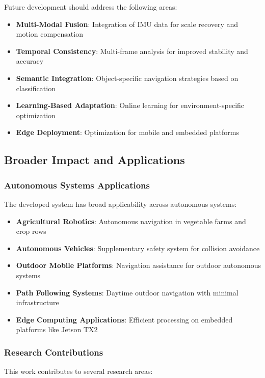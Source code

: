 \documentclass[10pt]{article}
\begin{document}
Future development should address the following areas:

\begin{itemize}
\item \textbf{Multi-Modal Fusion}: Integration of IMU data for scale recovery and motion compensation
\item \textbf{Temporal Consistency}: Multi-frame analysis for improved stability and accuracy
\item \textbf{Semantic Integration}: Object-specific navigation strategies based on classification
\item \textbf{Learning-Based Adaptation}: Online learning for environment-specific optimization
\item \textbf{Edge Deployment}: Optimization for mobile and embedded platforms
\end{itemize}

\subsection{Broader Impact and Applications}

\subsubsection{Autonomous Systems Applications}

The developed system has broad applicability across autonomous systems:

\begin{itemize}
\item \textbf{Agricultural Robotics}: Autonomous navigation in vegetable farms and crop rows
\item \textbf{Autonomous Vehicles}: Supplementary safety system for collision avoidance
\item \textbf{Outdoor Mobile Platforms}: Navigation assistance for outdoor autonomous systems
\item \textbf{Path Following Systems}: Daytime outdoor navigation with minimal infrastructure
\item \textbf{Edge Computing Applications}: Efficient processing on embedded platforms like Jetson TX2
\end{itemize}

\subsubsection{Research Contributions}

This work contributes to several research areas:
\end{document}
